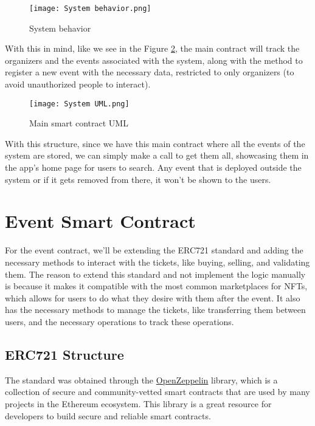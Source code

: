 \begin{figure}[H]
    \texttt{[image: System behavior.png]}
    \centering
    \caption{System behavior}
    \label{fig:system_behavior}
\end{figure}

With this in mind, like we see in the Figure \ref{fig:system_uml}, the main contract will track the organizers and the events associated with the system, along with the method to register a new event with the necessary data, restricted to only organizers (to avoid unauthorized people to interact).

\begin{figure}[H]
    \texttt{[image: System UML.png]}
    \centering
    \caption{Main smart contract UML}
    \label{fig:system_uml}
\end{figure}

With this structure, since we have this main contract where all the events of the system are stored, we can simply make a call to get them all, showcasing them in the app's home page for users to search. Any event that is deployed outside the system or if it gets removed from there, it won't be shown to the users.

\section{Event Smart Contract}
\label{sec:event_smart_contract}

For the event contract, we'll be extending the ERC721 standard and adding the necessary methods to interact with the tickets, like buying, selling, and validating them. The reason to extend this standard and not implement the logic manually is because it makes it compatible with the most common marketplaces for NFTs, which allows for users to do what they desire with them after the event. It also has the necessary methods to manage the tickets, like transferring them between users, and the necessary operations to track these operations.

\subsection{ERC721 Structure}
\label{subsec:erc721_structure}

The standard was obtained through the \href{https://docs.openzeppelin.com/contracts/api/token/erc721#ERC721}{OpenZeppelin} library, which is a collection of secure and community-vetted smart contracts that are used by many projects in the Ethereum ecosystem. This library is a great resource for developers to build secure and reliable smart contracts.

